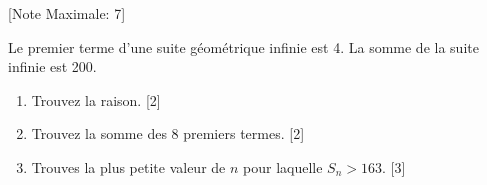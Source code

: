 \begin{question}
  \hspace*{\fill} [Note Maximale: 7]\par
  \medskip

  \noindent Le premier terme d'une suite géométrique infinie est 4. La somme de la suite infinie est 200.\par
  \begin{enumerate}[label=(\alph*)]
    \item Trouvez la raison.\hspace*{\fill} [2]
    \item Trouvez la somme des 8 premiers termes.\hspace*{\fill} [2]
    \item Trouves la plus petite valeur de $n$ pour laquelle $S_n > 163$.\hspace*{\fill} [3]
  \end{enumerate}
\end{question}

